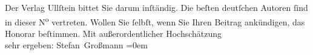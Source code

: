 \begin{ledgroupsized}[t]{13cm}
           \pstart
           Der Verlag Ullſtein bittet Sie darum inſtändig.
                    Die beſten deutſchen Autoren ſind in dieser N\textsuperscript{o}
                    vertreten. Wollen Sie ſelbſt, wenn Sie Ihren Beitrag ankündigen, das Honorar
                    beſtimmen.\pend
           \pstart
           Mit außerordentlicher Hochschätzung{\\[\baselineskip]}sehr ergeben: \spacefill\mbox{Stefan
                        Großmann}\pend
           \leftskip=0em{}\endnumbering{}\end{ledgroupsized}  \newcommand{\dateiname}{L02158}\newcommand{\titel}{Stefan Großmann an Arthur Schnitzler, 30. 11. 1913}\newcommand{\editorInnen}{Martin Anton Müller und Gerd-Hermann Susen}
      
